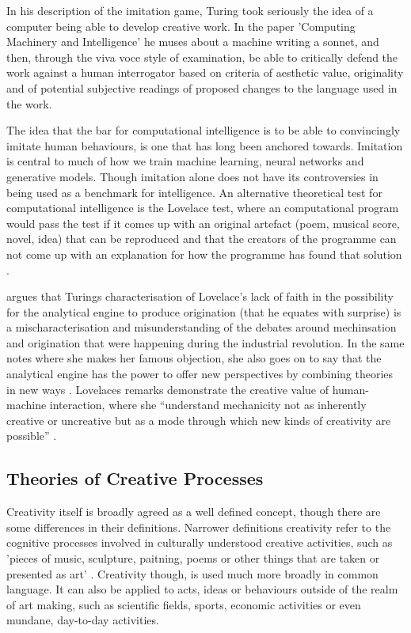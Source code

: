 In his description of the imitation game, Turing took seriously the idea of a computer being able to develop creative work. 
In the paper 'Computing Machinery and Intelligence' he muses about a machine writing a sonnet, and then, through the viva voce style of examination, be able to critically defend the work against a human interrogator based on criteria of aesthetic value, originality and of potential subjective readings of proposed changes to the language used in the work.

The idea that the bar for computational intelligence is to be able to convincingly imitate human behaviours, is one that has long been anchored towards. 
Imitation is central to much of how we train machine learning, neural networks and generative models. 
Though imitation alone does not have its controversies in being used as a benchmark for intelligence. 
An alternative theoretical test for computational intelligence is the Lovelace test, where an computational program would pass the test if it comes up with an original artefact (poem, musical score, novel, idea) that can be reproduced and that the creators of the programme can not come up with an explanation for how the programme has found that solution \citep{bringsjord2003creativity}. 

\cite{ward2020computational} argues that Turings characterisation of Lovelace's lack of faith in the possibility for the analytical engine to produce origination (that he equates with surprise) is a mischaracterisation and misunderstanding of the debates around mechinsation and origination that were happening during the industrial revolution. 
In the same notes where she makes her famous objection, she also goes on to say that the analytical engine has the power to offer new perspectives by combining theories in new ways \citep{lovelace1843notes}.
 Lovelaces remarks demonstrate the creative value of human-machine interaction, where she ``understand mechanicity not as inherently creative or uncreative but as a mode through which new kinds of creativity are possible'' \citep{ward2020computational}.

\subsection{Theories of Creative Processes}

Creativity itself is broadly agreed as a well defined concept, though there are some differences in their definitions. 
Narrower definitions creativity refer to the cognitive processes involved in culturally understood creative activities, such as 'pieces of music, sculpture, paitning, poems or other things that are taken or presented as art' \citep{wiggins2015evolutionary}.
Creativity though, is used much more broadly in common language. 
It can also be applied to acts, ideas or behaviours outside of the realm of art making, such as scientific fields, sports, economic activities or even mundane, day-to-day activities.


